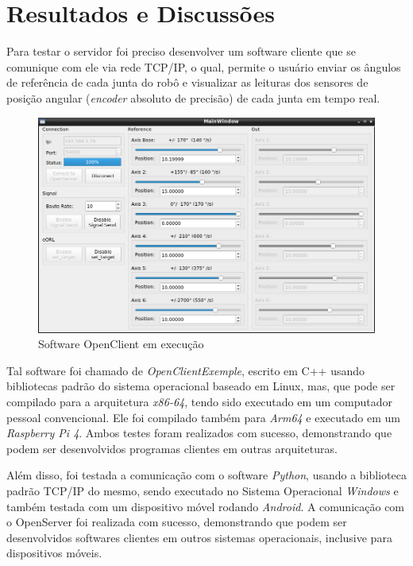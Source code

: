 \section{Resultados e Discussões}
    
    Para testar o servidor foi preciso desenvolver um software cliente que se comunique com ele via rede TCP/IP, o qual, permite o usuário enviar os ângulos de referência de cada junta do robô e visualizar as leituras dos sensores de posição angular (\textit{encoder} absoluto de precisão) de cada junta em tempo real. 
    
    \begin{figure}[H]
        \centering
        \includegraphics[width=\columnwidth]{imagens/Softwares/openclient_.png}
        \small 
        \centering 
        \caption{Software OpenClient em execução}
        \label{openclient_}
    \end{figure}
    
    Tal software foi chamado de \textit{OpenClientExemple}, escrito em C++ usando bibliotecas padrão do sistema operacional baseado em Linux, mas, que pode ser compilado para a arquitetura \textit{x86-64}, tendo sido executado em um computador pessoal convencional. Ele foi compilado também para \textit{Arm64} e executado em um \textit{Raspberry Pi 4}. Ambos testes foram realizados com sucesso, demonstrando que podem ser desenvolvidos programas clientes em outras arquiteturas.
    
    Além disso, foi testada a comunicação com o software \textit{Python}, usando a biblioteca padrão TCP/IP do mesmo, sendo executado no Sistema Operacional \textit{Windows} e também testada com um dispositivo móvel rodando \textit{Android}. A comunicação com o OpenServer foi realizada com sucesso, demonstrando que podem ser desenvolvidos softwares clientes em outros sistemas operacionais, inclusive para dispositivos móveis.
    
